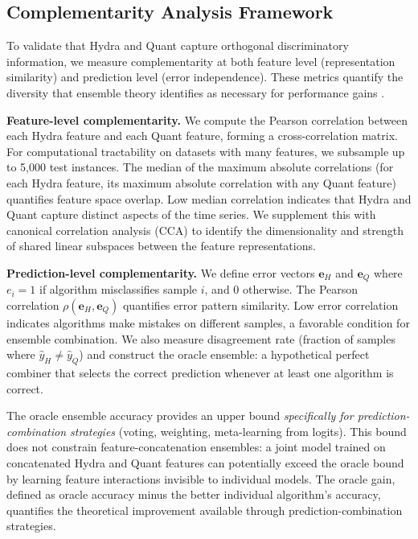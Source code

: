\documentclass[pdflatex,sn-basic]{sn-jnl}           %
\theoremstyle{thmstyleone}%
\theoremstyle{thmstyletwo}%
\theoremstyle{thmstylethree}%
\begin{document}
\subsection{Complementarity Analysis Framework}\label{subsec:complementarity}

To validate that Hydra and Quant capture orthogonal discriminatory information, we measure complementarity at both feature level (representation similarity) and prediction level (error independence). These metrics quantify the diversity that ensemble theory identifies as necessary for performance gains \citep{stacked-generalization}.

\textbf{Feature-level complementarity.} We compute the Pearson correlation between each Hydra feature and each Quant feature, forming a cross-correlation matrix. For computational tractability on datasets with many features, we subsample up to 5,000 test instances. The median of the maximum absolute correlations (for each Hydra feature, its maximum absolute correlation with any Quant feature) quantifies feature space overlap. Low median correlation indicates that Hydra and Quant capture distinct aspects of the time series. We supplement this with canonical correlation analysis (CCA) to identify the dimensionality and strength of shared linear subspaces between the feature representations.

\textbf{Prediction-level complementarity.} We define error vectors $\mathbf{e}_H$ and $\mathbf{e}_Q$ where $e_i = 1$ if algorithm misclassifies sample $i$, and 0 otherwise. The Pearson correlation $\rho(\mathbf{e}_H, \mathbf{e}_Q)$ quantifies error pattern similarity. Low error correlation indicates algorithms make mistakes on different samples, a favorable condition for ensemble combination. We also measure disagreement rate (fraction of samples where $\hat{y}_H \neq \hat{y}_Q$) and construct the oracle ensemble: a hypothetical perfect combiner that selects the correct prediction whenever at least one algorithm is correct.

The oracle ensemble accuracy provides an upper bound \textit{specifically for prediction-combination strategies} (voting, weighting, meta-learning from logits). This bound does not constrain feature-concatenation ensembles: a joint model trained on concatenated Hydra and Quant features can potentially exceed the oracle bound by learning feature interactions invisible to individual models. The oracle gain, defined as oracle accuracy minus the better individual algorithm's accuracy, quantifies the theoretical improvement available through prediction-combination strategies.
\end{document}
